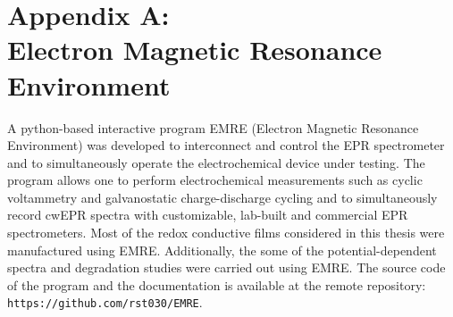 \chapter*{Appendix A:\\Electron Magnetic Resonance Environment}
A python-based interactive program EMRE (Electron Magnetic Resonance Environment) was developed to interconnect and control the EPR spectrometer and to simultaneously operate the electrochemical device under testing. The program allows one to perform electrochemical measurements such as cyclic voltammetry and galvanostatic charge-discharge cycling and to simultaneously record cwEPR spectra with customizable, lab-built and commercial EPR spectrometers. Most of the redox conductive films considered in this thesis were manufactured using EMRE. Additionally, the some of the potential-dependent spectra and degradation studies were carried out using EMRE. The source code of the program and the documentation is available at the remote repository:\\ \texttt{https://github.com/rst030/EMRE}.